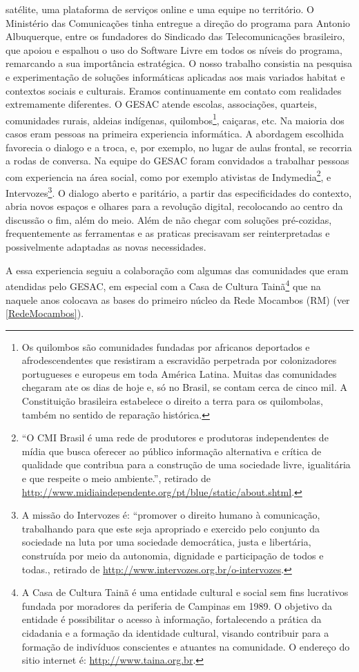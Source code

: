satélite, uma plataforma de serviços online e uma equipe no
território. O Ministério das Comunicações tinha entregue a direção do
programa para Antonio Albuquerque, entre os fundadores do Sindicado
das Telecomunicações brasileiro, que apoiou e espalhou o uso do
Software Livre em todos os níveis do programa, remarcando a sua
importância estratégica. O nosso trabalho consistia na pesquisa e
experimentação de soluções informáticas aplicadas aos mais variados
habitat e contextos sociais e culturais. Eramos continuamente em
contato com realidades extremamente diferentes. O GESAC atende
escolas, associações, quarteis, comunidades rurais, aldeias indígenas,
quilombos\footnote{Os quilombos são comunidades fundadas por africanos
  deportados e afrodescendentes que resistiram a escravidão perpetrada
  por colonizadores portugueses e europeus em toda América
  Latina. Muitas das comunidades chegaram ate os dias de hoje e, só no
  Brasil, se contam cerca de cinco mil. A Constituição brasileira
  estabelece o direito a terra para os quilombolas, também no sentido
  de reparação histórica.}, caiçaras, etc. Na maioria dos casos eram
pessoas na primeira experiencia informática. A abordagem escolhida
favorecia o dialogo e a troca, e, por exemplo, no lugar de aulas
frontal, se recorria a rodas de conversa. Na equipe do GESAC foram
convidados a trabalhar pessoas com experiencia na área social, como
por exemplo ativistas de Indymedia\footnote{``O CMI Brasil é uma rede
  de produtores e produtoras independentes de mídia que busca oferecer
  ao público informação alternativa e crítica de qualidade que
  contribua para a construção de uma sociedade livre, igualitária e
  que respeite o meio ambiente.'', retirado de
  \url{http://www.midiaindependente.org/pt/blue/static/about.shtml}.},
e Intervozes\footnote{A missão do Intervozes é: ``promover o direito
  humano à comunicação, trabalhando para que este seja apropriado e
  exercido pelo conjunto da sociedade na luta por uma sociedade
  democrática, justa e libertária, construída por meio da autonomia,
  dignidade e participação de todos e todas., retirado de
  \url{http://www.intervozes.org.br/o-intervozes}.}. O dialogo aberto
e paritário, a partir das especificidades do contexto, abria novos
espaços e olhares para a revolução digital, recolocando ao centro da
discussão o fim, além do meio. Além de não chegar com soluções
pré-cozidas, frequentemente as ferramentas e as praticas precisavam
ser reinterpretadas e possivelmente adaptadas as novas necessidades.

A essa experiencia seguiu a colaboração com algumas das comunidades
que eram atendidas pelo GESAC, em especial com a Casa de Cultura
Tainã\footnote{A Casa de Cultura Tainã é uma entidade cultural e
  social sem fins lucrativos fundada por moradores da periferia de
  Campinas em 1989.  O objetivo da entidade é possibilitar o acesso à
  informação, fortalecendo a prática da cidadania e a formação da
  identidade cultural, visando contribuir para a formação de
  indivíduos conscientes e atuantes na comunidade. O endereço do sitio
  internet é: \url{http://www.taina.org.br}.} que na naquele anos
colocava as bases do primeiro núcleo da Rede Mocambos (RM) (ver
\ref{RedeMocambos}).

